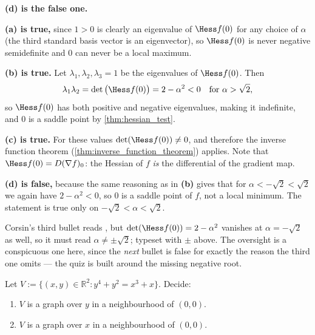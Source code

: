 \begin{answer}
\textbf{(d) is the false one.}

\textbf{(a) is true,} since $1 > 0$ is clearly an eigenvalue of $\Hess f(0)$ for any choice of
$\alpha$ (the third standard basis vector is an eigenvector), so $\Hess f(0)$ is never negative
semidefinite and $0$ can never be a local maximum.

\textbf{(b) is true.} Let $\lambda_1,\lambda_2,\lambda_3 = 1$ be the eigenvalues of
$\Hess f(0)$. Then
\[\lambda_1\lambda_2 = \det\big(\Hess f(0)\big) = 2-\alpha^2 < 0 \quad \text{for } \alpha > \sqrt2,\]
so $\Hess f(0)$ has both positive and negative eigenvalues, making it indefinite, and $0$ is a
saddle point by \cref{thm:hessian_test}.

\textbf{(c) is true.} For these values $\det(\Hess f(0)) \neq 0$, and therefore the inverse
function theorem (\cref{thm:inverse_function_theorem}) applies. Note that
$\Hess f(0) = D(\nabla f)_0$: the Hessian of $f$ \emph{is} the differential of the gradient map.

\textbf{(d) is false,} because the same reasoning as in \textbf{(b)} gives that for
$\alpha < -\sqrt2 < \sqrt2$ we again have $2-\alpha^2 < 0$, so $0$ is a saddle point of $f$, not
a local minimum. The statement is true only on $-\sqrt2 < \alpha < \sqrt2$.
\end{answer}

\begin{ainote}
Corsin's third bullet reads , but $\det(\Hess f(0)) = 2-\alpha^2$
vanishes at $\alpha = -\sqrt2$ as well, so it must read $\alpha \neq \pm\sqrt2$; typeset with
$\pm$ above. The oversight is a conspicuous one here, since the \emph{next} bullet is false for
exactly the reason the third one omits --- the quiz is built around the missing negative root.

\end{ainote}

\begin{question}
\label{q:week08_q6}
Let $V := \{(x,y) \in \mathbb{R}^2 : y^4+y^2 = x^3+x\}$. Decide:
\begin{enumerate}[label=\textbf{(\alph*)}]
  \item $V$ is a graph over $y$ in a neighbourhood of $(0,0)$.
  \item $V$ is a graph over $x$ in a neighbourhood of $(0,0)$.
\end{enumerate}
\end{question}

